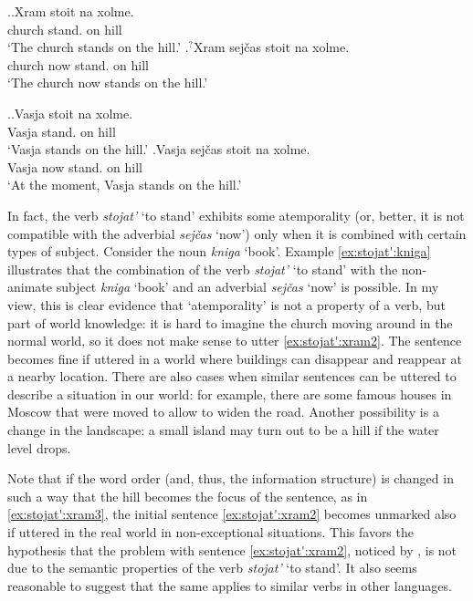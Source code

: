 \ex.\label{ex:stojat':xram}\ag.Xram stoit na xolme.\\
church stand. on hill\\
\trans `The church stands on the hill.'
\bg.\label{ex:stojat':xram2}$^?$Xram sej\v{c}as stoit na xolme.\\
church now stand. on hill\\
\trans `The church now stands on the hill.'

\ex.\label{ex:stojat':Vasja}\ag.Vasja stoit na xolme.\\
Vasja stand. on hill\\
\trans `Vasja stands on the hill.'
\bg.Vasja sej\v{c}as stoit na xolme.\\
Vasja now stand. on hill\\
\trans `At the moment, Vasja stands on the hill.'

In fact, the verb \textit{stojat'} `to stand' exhibits some atemporality (or, better, it is not compatible with the adverbial \textit{sej\v{c}as} `now') only when it is combined with certain types of subject. Consider the noun \textit{kniga} `book'. Example \ref{ex:stojat':kniga} illustrates that the combination of the verb \textit{stojat'} `to stand' with the non-animate subject \textit{kniga} `book' and an adverbial \textit{sej\v{c}as} `now' is possible.  In my view, this is clear evidence that `atemporality' is not a property of a verb, but part of world knowledge: it is hard to imagine the church moving around in the normal world, so it does not make sense to utter \ref{ex:stojat':xram2}. The sentence becomes fine if uttered in a world where buildings can disappear and reappear at a nearby location. There are also cases when similar sentences can be uttered to describe a situation in our world: for example, there are some famous houses in Moscow that were moved to allow to widen the road. Another possibility is a change in the landscape: a small island may turn out to be a hill if the water level drops. 

Note that if the word order (and, thus, the information structure) is changed in such a way that the hill becomes the focus of the sentence, as in \ref{ex:stojat':xram3}, the initial sentence \ref{ex:stojat':xram2} becomes unmarked also if uttered in the real world in non-exceptional situations. This favors the hypothesis that the problem with  sentence \ref{ex:stojat':xram2}, noticed by \citet{Paducheva:96}, is not due to the semantic properties of the verb \textit{stojat'} `to stand'. It also seems reasonable to suggest that the same applies to similar verbs in other languages. 

